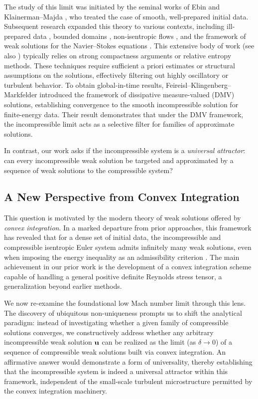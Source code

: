 \documentclass[12pt,reqno]{amsart}
\theoremstyle{definition}
\theoremstyle{remark}
\numberwithin{equation}{section}
\renewcommand{\u}{{\bf u}}
\begin{document}
The study of this limit was initiated by the seminal works of Ebin \cite{Ebin} and Klainerman--Majda \cite{KM, KM2}, who treated the case of smooth, well-prepared initial data. Subsequent research expanded this theory to various contexts, including ill-prepared data \cite{Ukai} , bounded domains \cite{Scho}, non-isentropic flows \cite{MS2,MS0}, and the framework of weak solutions for the Navier--Stokes equations \cite{Feireisl-incom,LM, LM2, LM3}. This extensive body of work (see also \cite{BDGL,BFH, CJ, FKMV, Fu,SEC}) typically relies on strong compactness arguments or relative entropy methods. These techniques require sufficient a priori estimates or structural assumptions on the solutions, effectively filtering out highly oscillatory or turbulent behavior.
To obtain global-in-time results, Feireisl--Klingenberg--Markfelder \cite{FKM} introduced the framework of dissipative measure-valued (DMV) solutions, establishing convergence to the smooth incompressible solution for finite-energy data. Their result demonstrates that under the DMV framework, the incompressible limit acts as a selective filter for families of approximate solutions. 

In contrast, our work asks if the incompressible system is a \emph{universal attractor}: can every incompressible weak solution be targeted and approximated by a sequence of weak solutions to the compressible system?

\subsection*{A New Perspective from Convex Integration}
This question is motivated by the modern theory of weak solutions offered by \emph{convex integration}. In a marked departure from prior approaches, this framework has revealed that for a dense set of initial data, the incompressible and compressible isentropic Euler system admits infinitely many weak solutions, even when imposing the energy inequality as an admissibility criterion \cite{CVY,SW}. The main achievement in our prior work \cite{CVY} is the development of a convex integration scheme capable of handling a general positive definite Reynolds stress tensor, a  generalization beyond earlier methods.

We now re-examine the foundational low Mach number limit through this lens. The discovery of ubiquitous non-uniqueness prompts us to shift the analytical paradigm: instead of investigating whether a given family of compressible solutions converges, we constructively address whether any arbitrary incompressible weak solution $\u$ can be realized as the limit (as $\delta \to 0$) of a sequence of compressible weak solutions built via convex integration. An affirmative answer would demonstrate a form of universality, thereby establishing that the incompressible system is indeed a universal attractor within this framework, independent of the small-scale turbulent microstructure permitted by the convex integration machinery.
\end{document}
